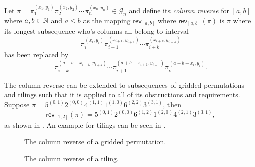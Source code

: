 \begin{definition}\label{def:rrgp}
Let $\pi=\pi_1^{(x_1,y_1)}\pi_2^{(x_2,y_2)}\dotsm\pi_n^{(x_n,y_n)} \in \mathcal{G}_n$ and define its \emph{column reverse} for $[a,b]$ where $a,b\in\mathbb{N}$ and $a\leq b$ as the mapping $\textsf{rev}_{[a,b]}$ where $\textsf{rev}_{[a,b]}(\pi)$ is $\pi$ where its longest subsequence who's columns all belong to interval
\[
\pi_{i}^{(x_i,y_i)}\pi_{i+1}^{(x_{i+1},y_{i+1})}\dotsm\pi_{i+k}^{(x_{i+k},y_{i+k})}
\]
has been replaced by 
\[
    \pi_{i+k}^{(a+b-x_{i+k},y_{i+k})}\dotsm\pi_{i+1}^{(a+b-x_{i+1},y_{i+1})}\pi_{i}^{(a+b-x_i,y_i)}.
\]
\end{definition}

The column reverse can be extended to subsequences of gridded permutations and tilings such that it is applied to all of its obstructions and requirements. Suppose $\pi = 5^{(0,1)}2^{(0,0)}4^{(1,1)}1^{(1,0)}6^{(2,2)}3^{(3,1)}$, then 
\[
\textsf{rev}_{[1,2]}(\pi) = 5^{(0,1)}2^{(0,0)}6^{(1,2)}1^{(2,0)}4^{(2,1)}3^{(3,1)},
\]
as shown in . An example for tilings can be seen in .

\begin{figure}[ht!]
    \centering
    
    \caption{The column reverse of a gridded permutation.}
    \label{fig:gp_col_rev}
\end{figure}

\begin{figure}[ht!]
    \centering
    
    \caption{The column reverse of a tiling.}
    \label{fig:t_col_rev}
\end{figure}

